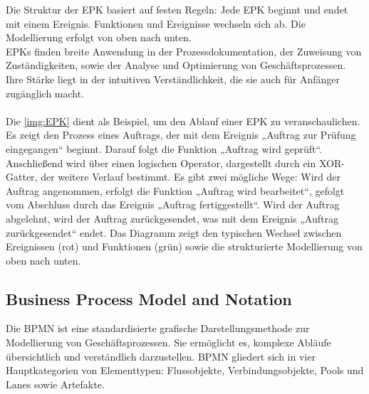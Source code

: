 Die Struktur der \ac{EPK} basiert auf festen Regeln: Jede \ac{EPK} beginnt und endet mit einem Ereignis. Funktionen und Ereignisse wechseln sich ab. Die Modellierung erfolgt von oben nach unten.\\
\ac{EPK}s finden breite Anwendung in der Prozessdokumentation, der Zuweisung von Zuständigkeiten, sowie der Analyse und Optimierung von Geschäftsprozessen. Ihre Stärke liegt in der intuitiven Verständlichkeit, die sie auch für Anfänger zugänglich macht.\\
\\
\newpage
Die \autoref{img:EPK} dient als Beispiel, um den Ablauf einer \ac{EPK} zu veranschaulichen. Es zeigt den Prozess eines Auftrags, der mit dem Ereignis „Auftrag zur Prüfung eingegangen“ beginnt.
Darauf folgt die Funktion „Auftrag wird geprüft“. Anschließend wird über einen logischen Operator, dargestellt durch ein \ac{XOR}-Gatter, der weitere Verlauf bestimmt.
Es gibt zwei mögliche Wege: Wird der Auftrag angenommen, erfolgt die Funktion „Auftrag wird bearbeitet“, gefolgt vom Abschluss durch das Ereignis „Auftrag fertiggestellt“. Wird der Auftrag abgelehnt, wird der Auftrag zurückgesendet, was mit dem Ereignis „Auftrag zurückgesendet“ endet. Das Diagramm zeigt den typischen Wechsel zwischen Ereignissen (rot) und Funktionen (grün) sowie die strukturierte Modellierung von oben nach unten. \cite[Vgl.][S. 202-214]{Gadatsch} \cite[Vgl.][S. 9-11]{Scheer} \cite[Vgl.][]{Durst}

\newpage
\subsection{Business Process Model and Notation}
Die \ac{BPMN} ist eine standardisierte grafische Darstellungsmethode zur Modellierung von Geschäftsprozessen. Sie ermöglicht es, komplexe Abläufe übersichtlich und verständlich darzustellen. \ac{BPMN} gliedert sich in vier Hauptkategorien von Elementtypen: Flussobjekte, Verbindungsobjekte, Pools und Lanes sowie Artefakte.


